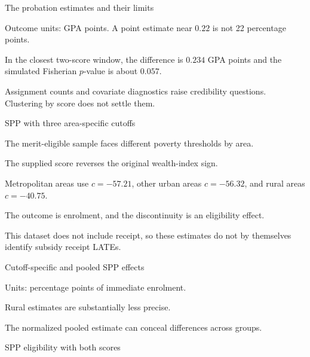\begin{frame}{The probation estimates and their limits}

\begin{items}
\item Outcome units: GPA points. A point estimate near $0.22$ is not 22 percentage points.
\item In the closest two-score window, the difference is $0.234$ GPA points and the simulated Fisherian $p$-value is about $0.057$.
\item Assignment counts and covariate diagnostics raise credibility questions. Clustering by score does not settle them.
\end{items}
\end{frame}

\begin{frame}{SPP with three area-specific cutoffs}
\begin{items}
\item The merit-eligible sample faces different poverty thresholds by area.
\item The supplied score reverses the original wealth-index sign.
\item Metropolitan areas use $c=-57.21$, other urban areas $c=-56.32$, and rural areas $c=-40.75$.
\item The outcome is enrolment, and the discontinuity is an eligibility effect.
\item This dataset does not include receipt, so these estimates do not by themselves identify subsidy receipt LATEs.
\end{items}
\end{frame}

\begin{frame}{Cutoff-specific and pooled SPP effects}

\begin{items}
\item Units: percentage points of immediate enrolment.
\item Rural estimates are substantially less precise.
\item The normalized pooled estimate can conceal differences across groups.
\end{items}
\end{frame}

\begin{frame}{SPP eligibility with both scores}
\end{frame}

